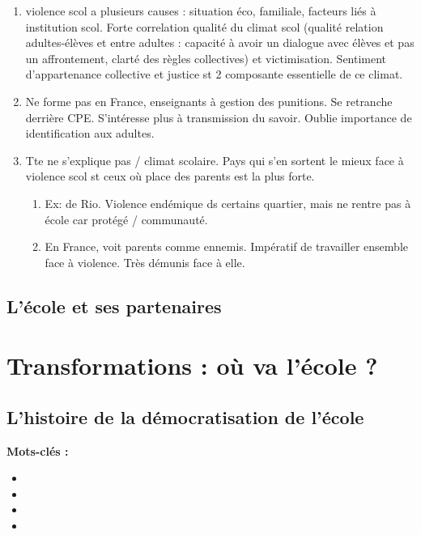 \documentclass[12pt]{report}
\begin{document}
\begin{itemize}
{\begin{minipage}{19cm}
\begin{enumerate}
\item violence scol a plusieurs causes : situation éco, familiale, facteurs liés à institution scol. Forte correlation qualité du climat scol (qualité relation adultes-élèves et entre adultes : capacité à avoir un dialogue avec élèves et pas un affrontement, clarté des règles collectives) et victimisation. Sentiment d'appartenance collective et justice st 2 composante essentielle de ce climat.\\
\item Ne forme pas en France, enseignants à gestion des punitions. Se retranche derrière CPE. S'intéresse plus à transmission du savoir. Oublie importance de identification aux adultes.\\
\item  Tte ne s'explique pas / climat scolaire. Pays qui s'en sortent le mieux face à violence scol st ceux où place des parents est la plus forte.
\begin{enumerate}
\item Ex: de Rio. Violence endémique ds certains quartier, mais ne rentre pas à école car protégé / communauté. 
\item En France, voit parents comme ennemis. Impératif de travailler ensemble face à violence. Très démunis face à elle.
\end{enumerate}
\end{enumerate}

\end{minipage}
}



\chapter{L'école et ses partenaires}

\part{Transformations : où va l'école ?}

\chapter{L'histoire de la démocratisation de l'école}

\textbf{Mots-clés : } 

\begin{itemize}
\item 
\item 
\item 
\item   
\end{itemize}


\end{itemize}
\end{document}
